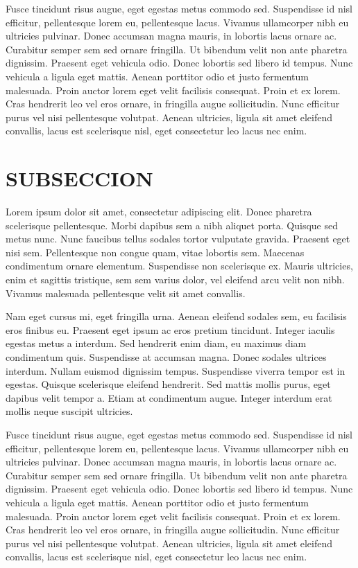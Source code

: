 Fusce tincidunt risus augue, eget egestas metus commodo sed. Suspendisse id nisl efficitur, pellentesque lorem eu, pellentesque lacus. Vivamus ullamcorper nibh eu ultricies pulvinar. Donec accumsan magna mauris, in lobortis lacus ornare ac. Curabitur semper sem sed ornare fringilla. Ut bibendum velit non ante pharetra dignissim. Praesent eget vehicula odio. Donec lobortis sed libero id tempus. Nunc vehicula a ligula eget mattis. Aenean porttitor odio et justo fermentum malesuada. Proin auctor lorem eget velit facilisis consequat. Proin et ex lorem. Cras hendrerit leo vel eros ornare, in fringilla augue sollicitudin. Nunc efficitur purus vel nisi pellentesque volutpat. Aenean ultricies, ligula sit amet eleifend convallis, lacus est scelerisque nisl, eget consectetur leo lacus nec enim.

\section{SUBSECCION}
Lorem ipsum dolor sit amet, consectetur adipiscing elit. Donec pharetra scelerisque pellentesque. Morbi dapibus sem a nibh aliquet porta. Quisque sed metus nunc. Nunc faucibus tellus sodales tortor vulputate gravida. Praesent eget nisi sem. Pellentesque non congue quam, vitae lobortis sem. Maecenas condimentum ornare elementum. Suspendisse non scelerisque ex. Mauris ultricies, enim et sagittis tristique, sem sem varius dolor, vel eleifend arcu velit non nibh. Vivamus malesuada pellentesque velit sit amet convallis.

Nam eget cursus mi, eget fringilla urna. Aenean eleifend sodales sem, eu facilisis eros finibus eu. Praesent eget ipsum ac eros pretium tincidunt. Integer iaculis egestas metus a interdum. Sed hendrerit enim diam, eu maximus diam condimentum quis. Suspendisse at accumsan magna. Donec sodales ultrices interdum. Nullam euismod dignissim tempus. Suspendisse viverra tempor est in egestas. Quisque scelerisque eleifend hendrerit. Sed mattis mollis purus, eget dapibus velit tempor a. Etiam at condimentum augue. Integer interdum erat mollis neque suscipit ultricies.

Fusce tincidunt risus augue, eget egestas metus commodo sed. Suspendisse id nisl efficitur, pellentesque lorem eu, pellentesque lacus. Vivamus ullamcorper nibh eu ultricies pulvinar. Donec accumsan magna mauris, in lobortis lacus ornare ac. Curabitur semper sem sed ornare fringilla. Ut bibendum velit non ante pharetra dignissim. Praesent eget vehicula odio. Donec lobortis sed libero id tempus. Nunc vehicula a ligula eget mattis. Aenean porttitor odio et justo fermentum malesuada. Proin auctor lorem eget velit facilisis consequat. Proin et ex lorem. Cras hendrerit leo vel eros ornare, in fringilla augue sollicitudin. Nunc efficitur purus vel nisi pellentesque volutpat. Aenean ultricies, ligula sit amet eleifend convallis, lacus est scelerisque nisl, eget consectetur leo lacus nec enim.

